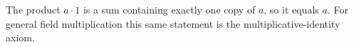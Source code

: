 The product $a\cdot1$ is a sum containing exactly one copy of $a$, so it equals $a$. For general field multiplication this same statement is the multiplicative-identity axiom.

